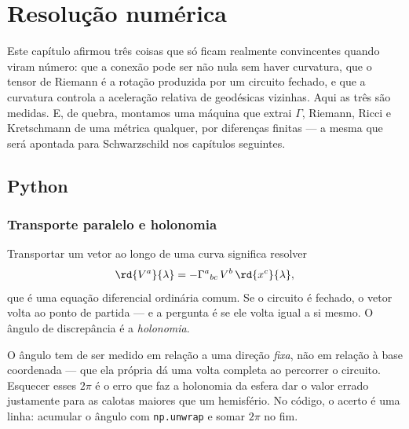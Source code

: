 \section{Resolução numérica}
\label{sec:cap07-numerica}

Este capítulo afirmou três coisas que só ficam realmente convincentes quando
viram número: que a conexão pode ser não nula sem haver curvatura, que o
tensor de Riemann é a rotação produzida por um circuito fechado, e que a
curvatura controla a aceleração relativa de geodésicas vizinhas. Aqui as três
são medidas. E, de quebra, montamos uma máquina que extrai $\Gamma$, Riemann,
Ricci e Kretschmann de uma métrica qualquer, por diferenças finitas --- a
mesma que será apontada para Schwarzschild nos capítulos seguintes.

\subsection{Python}


\subsubsection*{Transporte paralelo e holonomia}

Transportar um vetor ao longo de uma curva significa resolver
\begin{equation}
  \rd{V^a}{\lambda}
  = -\Gamma^a{}_{bc}\,V^b\,\rd{x^c}{\lambda},
  \label{eq:cap07-transporte}
\end{equation}
que é uma equação diferencial ordinária comum. Se o circuito é fechado, o
vetor volta ao ponto de partida --- e a pergunta é se ele volta igual a si
mesmo. O ângulo de discrepância é a \emph{holonomia}.

\begin{atencao}
O ângulo tem de ser medido em relação a uma direção \emph{fixa}, não em
relação à base coordenada --- que ela própria dá uma volta completa ao
percorrer o circuito. Esquecer esses $2\pi$ é o erro que faz a holonomia da
esfera dar o valor errado justamente para as calotas maiores que um
hemisfério. No código, o acerto é uma linha: acumular o ângulo com
\texttt{np.unwrap} e somar $2\pi$ no fim.
\end{atencao}

